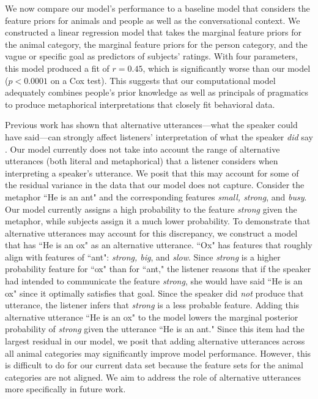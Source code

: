 \documentclass[10pt,letterpaper]{article}
\begin{document}
We now compare our model's performance to a baseline model that considers the feature priors for animals and people as well as the conversational context. We constructed a linear regression model that takes the marginal feature priors for the animal category, the marginal feature priors for the person category, and the vague or specific goal as predictors of subjects' ratings. With four parameters, this model produced a fit of $r= 0.45$, which is significantly worse than our model ($p < 0.0001$ on a Cox test). This suggests that our computational model adequately combines people's prior knowledge as well as principals of pragmatics to produce metaphorical interpretations that closely fit behavioral data.

Previous work has shown that alternative utterances---what the speaker could have said---can strongly affect listeners' interpretation of what the speaker \emph{did} say \cite{bergen2012s}. Our model currently does not take into account the range of alternative utterances (both literal and metaphorical) that a listener considers when interpreting a speaker's utterance. We posit that this may account for some of the residual variance in the data that our model does not capture. Consider the metaphor ``He is an ant" and the corresponding features \emph{small, strong}, and \emph{busy}. Our model currently assigns a high probability to the feature \emph{strong} given the metaphor, while subjects assign it a much lower probability. To demonstrate that alternative utterances may account for this discrepancy, we construct a model that has ``He is an ox" as an alternative utterance. ``Ox" has features that roughly align with features of ``ant": \emph{strong, big}, and \emph{slow}. Since \emph{strong} is a higher probability feature for ``ox" than for ``ant," the listener reasons that if the speaker had intended to communicate the feature \emph{strong}, she would have said ``He is an ox" since it optimally satisfies that goal. Since the speaker did \emph{not} produce that utterance, the listener infers that \emph{strong} is a less probable feature. Adding this alternative utterance ``He is an ox" to the model lowers the marginal posterior probability of \emph{strong} given the utterance ``He is an ant." Since this item had the largest residual in our model, we posit that adding alternative utterances across all animal categories may significantly improve model performance. However, this is difficult to do for our current data set because the feature sets for the animal categories are not aligned. We aim to address the role of alternative utterances more specifically in future work.
\end{document}
